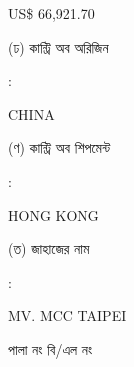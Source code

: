 \documentclass[12pt]{article}
\newcommand{\price}{US\$ 66,921.70}
\newcommand{\co}{CHINA}
\newcommand{\coship}{HONG KONG}
\newcommand{\vessel}{MV. MCC TAIPEI}
\begin{document}
\begin{minipage}[t]{0.50\linewidth}
{\price}
\\
\end{minipage}
\begin{minipage}[t]{0.05\linewidth}
\hspace*{1em}
\end{minipage}
\begin{minipage}[t]{0.45\linewidth}
(ঢ) কান্ট্রি অব অরিজিন
\end{minipage}
\begin{minipage}[t]{0.02\linewidth}
:
\end{minipage}
\begin{minipage}[t]{0.50\linewidth}
{\co}
\\
\end{minipage}
\begin{minipage}[t]{0.05\linewidth}
\hspace*{1em}
\end{minipage}
\begin{minipage}[t]{0.45\linewidth}
(ণ) কান্ট্রি অব শিপমেন্ট
\end{minipage}
\begin{minipage}[t]{0.02\linewidth}
:
\end{minipage}
\begin{minipage}[t]{0.50\linewidth}
{\coship}
\\
\end{minipage}
\begin{minipage}[t]{0.05\linewidth}
\hspace*{1em}
\end{minipage}
\begin{minipage}[t]{0.45\linewidth}
(ত) জাহাজের নাম
\end{minipage}
\begin{minipage}[t]{0.02\linewidth}
:
\end{minipage}
\begin{minipage}[t]{0.50\linewidth}
{\vessel}
\end{minipage}
\begin{minipage}[t]{0.05\linewidth}
\hspace*{1em}
\end{minipage}
\begin{minipage}[t]{0.45\linewidth}
\hspace*{1.8em}পালা নং বি/এল নং
\end{minipage}
\begin{minipage}[t]{0.02\linewidth}
\hspace{1em}
\end{minipage}
\end{document}
